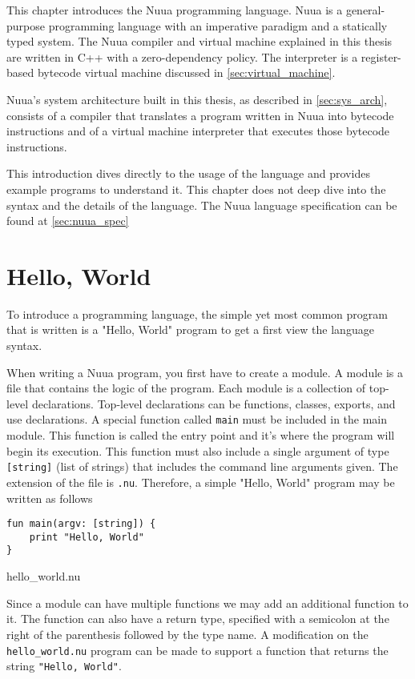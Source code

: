 This chapter introduces the Nuua programming language. Nuua is a general-purpose programming language with an imperative
paradigm and a statically typed system. The Nuua compiler and virtual machine explained in this thesis are written in C++
with a zero-dependency policy. The interpreter is a register-based bytecode virtual machine discussed in \autoref{sec:virtual_machine}.

Nuua's system architecture built in this thesis, as described in \autoref{sec:sys_arch}, consists of a compiler that translates a program written
in Nuua into bytecode instructions and of a virtual machine interpreter that executes those bytecode instructions.

This introduction dives directly to the usage of the language and provides example programs to understand it.
This chapter does not deep dive into the syntax and the details of the language. The Nuua language specification can be found at \autoref{sec:nuua_spec}

\section{Hello, World}

To introduce a programming language, the simple yet most common program that is written is a "Hello, World" program to get a first view the language syntax.

When writing a Nuua program, you first have to create a module. A module is a file that contains the logic of the program. Each module is a collection
of top-level declarations. Top-level declarations can be functions, classes, exports, and use declarations. A special function called \texttt{main}
must be included in the main module. This function is called the entry point and it's where the program will begin its execution. This function must also
include a single argument of type \texttt{[string]} (list of strings) that includes the command line arguments given.
The extension of the file is \texttt{.nu}. Therefore, a simple "Hello, World" program may be written as follows \\

\begin{code}
\begin{verbatim}
fun main(argv: [string]) {
    print "Hello, World"
}
\end{verbatim}
\caption{hello\_world.nu}
\label{ls:hello_world}
\end{code}

Since a module can have multiple functions we may add an additional function to it. The function can also have a return type, specified with a semicolon
at the right of the parenthesis followed by the type name. A modification on the \texttt{hello\_world.nu} program can be made to support a function that returns
the string \texttt{"Hello, World"}.\\

